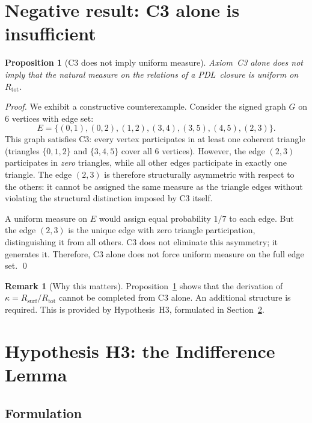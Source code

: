 \documentclass[11pt,a4paper]{article}
\newtheorem{proposition}[theorem]{Proposition}
\theoremstyle{definition}
\newtheorem{remark}[theorem]{Remark}
\newcommand{\PDL}{\textnormal{PDL}}
\newcommand{\Rtot}{R_{\mathrm{tot}}}
\newcommand{\Rsurf}{R_{\mathrm{surf}}}
\newcommand{\kap}{\kappa}
\begin{document}
\section{Negative result: C3 alone is insufficient}
\label{sec:negative}

\begin{proposition}[C3 does not imply uniform measure]
\label{prop:negative}
Axiom~C3 alone does not imply that the natural measure on the
relations of a \PDL\ closure is uniform on $\Rtot$.
\end{proposition}

\begin{proof}
We exhibit a constructive counterexample. Consider the signed graph
$G$ on 6 vertices with edge set:
\[
E = \{(0,1),(0,2),(1,2),(3,4),(3,5),(4,5),(2,3)\}.
\]
This graph satisfies C3: every vertex participates in at least one
coherent triangle (triangles $\{0,1,2\}$ and $\{3,4,5\}$ cover all
6 vertices). However, the edge $(2,3)$ participates in \emph{zero}
triangles, while all other edges participate in exactly one triangle.
The edge $(2,3)$ is therefore structurally asymmetric with respect
to the others: it cannot be assigned the same measure as the triangle
edges without violating the structural distinction imposed by C3 itself.

A uniform measure on $E$ would assign equal probability $1/7$ to each
edge. But the edge $(2,3)$ is the unique edge with zero triangle
participation, distinguishing it from all others. C3 does not eliminate
this asymmetry; it generates it. Therefore, C3 alone does not force
uniform measure on the full edge set. \qed
\end{proof}

\begin{remark}[Why this matters]
Proposition~\ref{prop:negative} shows that the derivation of
$\kap = \Rsurf/\Rtot$ cannot be completed from C3 alone. An additional
structure is required. This is provided by Hypothesis~H3, formulated
in Section~\ref{sec:H3}.
\end{remark}

\section{Hypothesis H3: the Indifference Lemma}
\label{sec:H3}

\subsection{Formulation}
\end{document}
